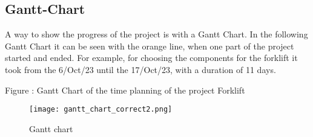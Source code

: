 \documentclass[../report.tex]{subfiles}
\begin{document}
    \subsection{Gantt-Chart}
    A way to show the progress of the project is with a Gantt Chart. 
    In the following Gantt Chart it can be seen with the orange line, 
    when one part of the project started and ended. For example, for 
    choosing the components for the forklift it took from the 6/Oct/23
     until the 17/Oct/23, with a duration of 11 days.



 Figure : Gantt Chart of the time planning of the project Forklift

 \begin{figure}[h!]
    \centering
    \texttt{[image: gantt\_chart\_correct2.png]}
    \caption{Gantt chart}
 \end{figure}
  
\end{document}
